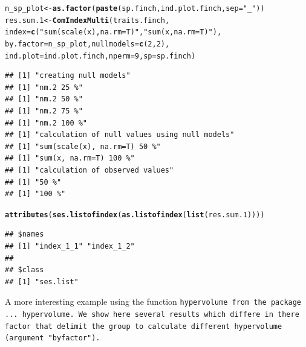 \documentclass[12pt]{article}\usepackage[]{graphicx}\usepackage[]{color}
\makeatletter
\newcommand{\hlnum}[1]{\textcolor[rgb]{0.686,0.059,0.569}{#1}}%
\newcommand{\hlstr}[1]{\textcolor[rgb]{0.192,0.494,0.8}{#1}}%
\newcommand{\hlstd}[1]{\textcolor[rgb]{0.345,0.345,0.345}{#1}}%
\newcommand{\hlkwb}[1]{\textcolor[rgb]{0.69,0.353,0.396}{#1}}%
\newcommand{\hlkwc}[1]{\textcolor[rgb]{0.333,0.667,0.333}{#1}}%
\newcommand{\hlkwd}[1]{\textcolor[rgb]{0.737,0.353,0.396}{\textbf{#1}}}%
\newenvironment{kframe}{%
 \def\at@end@of@kframe{}%
 \ifinner\ifhmode%
  \def\at@end@of@kframe{\end{minipage}}%
  \begin{minipage}{\columnwidth}%
 \fi\fi%
 \def\FrameCommand##1{\hskip\@totalleftmargin \hskip-\fboxsep
 \colorbox{shadecolor}{##1}\hskip-\fboxsep
     \hskip-\linewidth \hskip-\@totalleftmargin \hskip\columnwidth}%
 \MakeFramed {\advance\hsize-\width
   \@totalleftmargin\z@ \linewidth\hsize
   \@setminipage}}%
 {\par\unskip\endMakeFramed%
 \at@end@of@kframe}
\newenvironment{knitrout}{}{} %
\makeatother
\begin{document}
\begin{knitrout}
\color{fgcolor}\begin{kframe}
\begin{alltt}
\hlstd{n_sp_plot}\hlkwb{<-}\hlkwd{as.factor}\hlstd{(}\hlkwd{paste}\hlstd{(sp.finch, ind.plot.finch,} \hlkwc{sep}\hlstd{=}\hlstr{"_"}\hlstd{))}
\hlstd{res.sum.1}\hlkwb{<-}\hlkwd{ComIndexMulti}\hlstd{(traits.finch,}
                           \hlkwc{index}\hlstd{=}\hlkwd{c}\hlstd{(}\hlstr{"sum(scale(x), na.rm=T)"}\hlstd{,} \hlstr{"sum(x, na.rm=T)"}\hlstd{),}
                           \hlkwc{by.factor}\hlstd{=n_sp_plot,} \hlkwc{nullmodels}\hlstd{=}\hlkwd{c}\hlstd{(}\hlnum{2}\hlstd{,}\hlnum{2}\hlstd{),}
                           \hlkwc{ind.plot}\hlstd{=ind.plot.finch,} \hlkwc{nperm}\hlstd{=}\hlnum{9}\hlstd{,} \hlkwc{sp}\hlstd{=sp.finch)}
\end{alltt}
\begin{verbatim}
## [1] "creating null models"
## [1] "nm.2 25 %"
## [1] "nm.2 50 %"
## [1] "nm.2 75 %"
## [1] "nm.2 100 %"
## [1] "calculation of null values using null models"
## [1] "sum(scale(x), na.rm=T) 50 %"
## [1] "sum(x, na.rm=T) 100 %"
## [1] "calculation of observed values"
## [1] "50 %"
## [1] "100 %"
\end{verbatim}
\begin{alltt}
\hlkwd{attributes}\hlstd{(}\hlkwd{ses.listofindex}\hlstd{(}\hlkwd{as.listofindex}\hlstd{(}\hlkwd{list}\hlstd{(res.sum.1))))}
\end{alltt}
\begin{verbatim}
## $names
## [1] "index_1_1" "index_1_2"
## 
## $class
## [1] "ses.list"
\end{verbatim}
\end{kframe}
\end{knitrout}

\newpage
A more interesting example using the function \tt{hypervolume} from the package ... hypervolume.  We show here several results which differe in there factor that delimit the group to calculate different hypervolume (argument "byfactor"). 
\end{document}
